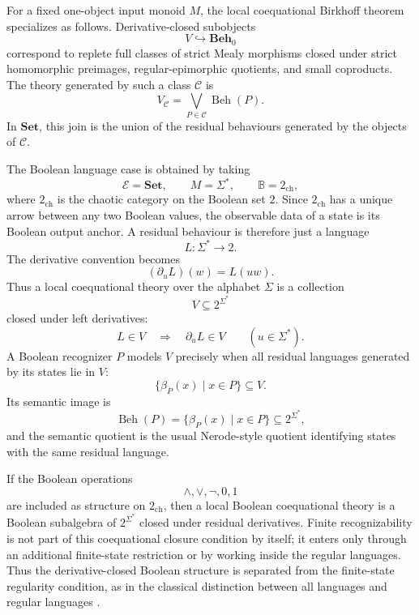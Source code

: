 For a fixed one-object input monoid \(M\), the local coequational Birkhoff
theorem specializes as follows. Derivative-closed subobjects
\[
    V\hookrightarrow\mathbf{Beh}_0
\]
correspond to replete full classes of strict Mealy morphisms closed under
strict homomorphic preimages, regular-epimorphic quotients, and small
coproducts. The theory generated by such a class \(\mathcal C\) is
\[
    V_{\mathcal C}
    =
    \bigvee_{P\in\mathcal C}\operatorname{Beh}(P).
\]
In \(\mathbf{Set}\), this join is the union of the residual behaviours
generated by the objects of \(\mathcal C\).

The Boolean language case is obtained by taking
\[
    \mathcal E=\mathbf{Set},
    \qquad
    M=\Sigma^*,
    \qquad
    \mathbb B=2_{\mathrm{ch}},
\]
where \(2_{\mathrm{ch}}\) is the chaotic category on the Boolean set \(2\).
Since \(2_{\mathrm{ch}}\) has a unique arrow between any two Boolean values,
the observable data of a state is its Boolean output anchor. A residual
behaviour is therefore just a language
\[
    L:\Sigma^*\to 2 .
\]
The derivative convention becomes
\[
    (\partial_uL)(w)=L(uw).
\]
Thus a local coequational theory over the alphabet \(\Sigma\) is a collection
\[
    V\subseteq 2^{\Sigma^*}
\]
closed under left derivatives:
\[
    L\in V
    \quad\Longrightarrow\quad
    \partial_uL\in V
    \qquad(u\in\Sigma^*).
\]
A Boolean recognizer \(P\) models \(V\) precisely when all residual languages
generated by its states lie in \(V\):
\[
    \{\beta_P(x)\mid x\in P\}\subseteq V .
\]
Its semantic image is
\[
    \operatorname{Beh}(P)
    =
    \{\beta_P(x)\mid x\in P\}
    \subseteq
    2^{\Sigma^*},
\]
and the semantic quotient is the usual Nerode-style quotient identifying
states with the same residual language.

If the Boolean operations
\[
    \wedge,\vee,\neg,0,1
\]
are included as structure on \(2_{\mathrm{ch}}\), then a local Boolean
coequational theory is a Boolean subalgebra of \(2^{\Sigma^*}\) closed under
residual derivatives. Finite recognizability is not part of this
coequational closure condition by itself; it enters only through an additional
finite-state restriction or by working inside the regular languages. Thus the
derivative-closed Boolean structure is separated from the finite-state
regularity condition, as in the classical distinction between all languages and
regular languages
\cite{Eilenberg1974,HopcroftMotwaniUllman2006,Brzozowski1964}.


